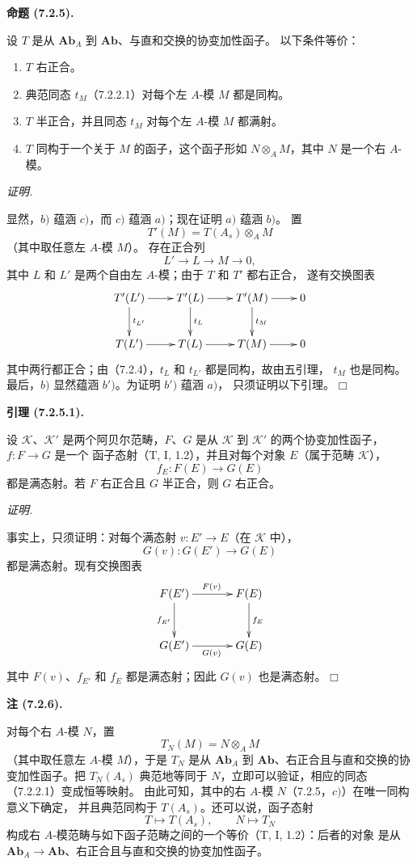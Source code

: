 \documentclass[UTF8,fontset=none,11pt,oneside,openany]{ctexbook}
\providecommand{\square}{\mdlgwhtsquare}
\newenvironment{lemma}[1][]{%
  \par\medskip\noindent\textbf{引理 (#1).}\ %
}{\par}
\newenvironment{proposition}[1][]{%
  \par\medskip\noindent\textbf{命题 (#1).}\ %
}{\par}
\newenvironment{remark}[1][]{%
  \par\medskip\noindent\textbf{注 (#1).}\ %
}{\par}
\newenvironment{proof}{%
  \par\smallskip\noindent\textit{证明.}\ %
}{\hfill$\square$\par}
\newcommand{\oldpage}[2][]{%
  \hypertarget{ega-source-page-#1-#2}{}%
  \marginnote{\scriptsize\textbf{#1}~|~#2}\ignorespaces}
\begin{document}
\begin{proposition}[7.2.5]
设 $T$ 是从 $\mathbf{Ab}_A$ 到 $\mathbf{Ab}$、与直和交换的协变加性函子。
以下条件等价：
\begin{enumerate}
  \item[a)] $T$ 右正合。
  \item[b)] 典范同态 $t_M$（7.2.2.1）对每个左 $A$-模 $M$ 都是同构。
  \item[$b'$)] $T$ 半正合，并且同态 $t_M$ 对每个左 $A$-模 $M$ 都满射。
  \item[c)] $T$ 同构于一个关于 $M$ 的函子，这个函子形如
    $N\otimes_A M$，其中 $N$ 是一个右 $A$-模。
\end{enumerate}
\end{proposition}

\begin{proof}
显然，$b)$ 蕴涵 $c)$，而 $c)$ 蕴涵 $a)$；现在证明 $a)$ 蕴涵 $b)$。
\oldpage[III]{179}
置
\[
  T'(M)=T(A_s)\otimes_A M
\]
（其中取任意左 $A$-模 $M$）。
存在正合列
\[
  L'\longrightarrow L\longrightarrow M\longrightarrow0,
\]
其中 $L$ 和 $L'$ 是两个自由左 $A$-模；由于 $T$ 和 $T'$ 都右正合，
遂有交换图表
\[
\xymatrix@C=22pt@R=25pt{
  T'(L')\ar[r]\ar[d]^{t_{L'}}
  &
  T'(L)\ar[r]\ar[d]^{t_L}
  &
  T'(M)\ar[r]\ar[d]^{t_M}
  &
  0
  \\
  T(L')\ar[r]
  &
  T(L)\ar[r]
  &
  T(M)\ar[r]
  &
  0
}
\]
其中两行都正合；由（7.2.4），$t_L$ 和 $t_{L'}$ 都是同构，故由五引理，
$t_M$ 也是同构。最后，$b)$ 显然蕴涵 $b')$。为证明 $b')$ 蕴涵 $a)$，
只须证明以下引理。
\end{proof}

\begin{lemma}[7.2.5.1]
设 $\mathcal K$、$\mathcal K'$ 是两个阿贝尔范畴，$F$、$G$ 是从
$\mathcal K$ 到 $\mathcal K'$ 的两个协变加性函子，$f:F\to G$ 是一个
函子态射（T, I, 1.2），并且对每个对象 $E$（属于范畴 $\mathcal K$），
\[
  f_E:F(E)\longrightarrow G(E)
\]
都是满态射。若 $F$ 右正合且 $G$ 半正合，则 $G$ 右正合。
\end{lemma}

\begin{proof}
事实上，只须证明：对每个满态射 $v:E'\to E$（在 $\mathcal K$ 中），
\[
  G(v):G(E')\longrightarrow G(E)
\]
都是满态射。现有交换图表
\[
\xymatrix@C=35pt@R=30pt{
  F(E')\ar[r]^{F(v)}\ar[d]_{f_{E'}}
  &
  F(E)\ar[d]^{f_E}
  \\
  G(E')\ar[r]_{G(v)}
  &
  G(E)
}
\]
其中 $F(v)$、$f_{E'}$ 和 $f_E$ 都是满态射；因此 $G(v)$ 也是满态射。
\end{proof}

\begin{remark}[7.2.6]
对每个右 $A$-模 $N$，置
\[
  T_N(M)=N\otimes_A M
\]
（其中取任意左 $A$-模 $M$），于是 $T_N$ 是从 $\mathbf{Ab}_A$ 到
$\mathbf{Ab}$、右正合且与直和交换的协变加性函子。把 $T_N(A_s)$
典范地等同于 $N$，立即可以验证，相应的同态（7.2.2.1）变成恒等映射。
由此可知，其中的右 $A$-模 $N$（7.2.5，$c)$）在唯一同构意义下确定，
并且典范同构于 $T(A_s)$。还可以说，函子态射
\[
  T\longmapsto T(A_s),
  \qquad
  N\longmapsto T_N
\]
构成右 $A$-模范畴与如下函子范畴之间的一个等价（T, I, 1.2）：后者的对象
是从 $\mathbf{Ab}_A\to\mathbf{Ab}$、右正合且与直和交换的协变加性函子。
\end{remark}
\end{document}
